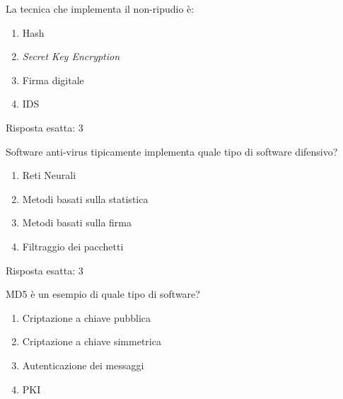 
\begin{Exercise} [
  title={Quiz},
  label={netriep3}
  ]

  \Question La tecnica che implementa il non-ripudio \`e:
\begin{enumerate}
 \item Hash
 \item \textit{Secret Key Encryption}
 \item Firma digitale
 \item IDS
\end{enumerate}

\end{Exercise}


\begin{Answer} [
  ref={netriep3},
  number={3}
  ]

  \Question Risposta esatta: 3

\end{Answer}


\begin{Exercise} [
  title={Quiz},
  label={netriep4}
  ]

  \Question Software anti-virus tipicamente implementa quale tipo di software
difensivo?
\begin{enumerate}
 \item Reti Neurali
 \item Metodi basati sulla statistica
 \item Metodi basati sulla firma
 \item Filtraggio dei pacchetti
\end{enumerate}

\end{Exercise}


\begin{Answer} [
  ref={netriep4},
  number={4}
  ]

  \Question Risposta esatta: 3

\end{Answer}


\begin{Exercise} [
  title={Quiz},
  label={netriep5}
  ]

  \Question MD5 \`e un esempio di quale tipo di software?
\begin{enumerate}
 \item Criptazione a chiave pubblica
 \item Criptazione a chiave simmetrica
 \item Autenticazione dei messaggi
 \item PKI
\end{enumerate}

\end{Exercise}


